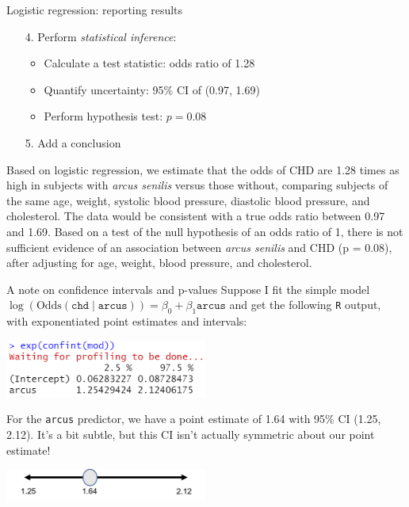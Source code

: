 \documentclass[10pt,t]{beamer}
\begin{document}
\begin{frame}{Logistic regression: reporting results}
	\begin{enumerate}
		\item[4.] Perform \textit{statistical inference}:
		\begin{itemize}
			\item Calculate a test statistic: odds ratio of 1.28
			\item Quantify uncertainty: 95\% CI of (0.97, 1.69)
			\item Perform hypothesis test: $p = 0.08$
		\end{itemize}
		\item[5.] Add a conclusion
	\end{enumerate}
	Based on logistic regression, we estimate that the odds of CHD are 1.28 times as high in subjects with \textit{arcus senilis} versus those without, comparing subjects of the same age, weight, systolic blood pressure, diastolic blood pressure, and cholesterol. The data would be consistent with a true odds ratio between 0.97 and 1.69. Based on a test of the null hypothesis of an odds ratio of 1, there is not sufficient evidence of an association between \textit{arcus senilis} and CHD (p = 0.08), after adjusting for age, weight, blood pressure, and cholesterol. 
\end{frame}

\begin{frame}{A note on confidence intervals and p-values}
	\vspace{-0.7cm}
	Suppose I fit the simple model $\log(\text{Odds}(\texttt{chd} \mid \texttt{arcus})) = \beta_0 + \beta_1 \texttt{arcus}$ and get the following \texttt{R} output, with exponentiated point estimates and intervals: 
	
	\begin{center}
	\includegraphics[width=0.5\textwidth]{./figs/asymmetric_CI}
	\end{center}
	For the \texttt{arcus} predictor, we have a point estimate of 1.64 with 95\% CI (1.25, 2.12). It's a bit subtle, but this CI isn't actually symmetric about our point estimate!
		\begin{center}
		\includegraphics[width=0.5\textwidth]{./figs/asymmetric_CI_pic}
	\end{center}
\end{frame}
\end{document}
